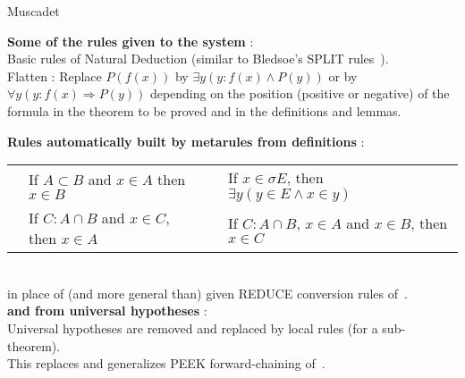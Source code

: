 
\calculusAcronym{\Muscadet}




\maketitle

\begin{entry}{Muscadet}  

\begin{calculus}

\textbf {Some of the rules given to the system} :\\
\hspace*{0.1cm} 
Basic rules of Natural Deduction (similar to Bledsoe's SPLIT rules~).\\
\hspace*{0.1cm} 
Flatten : Replace $P(f(x))$ by $\exists y(y:f(x) \land P(y))$ or by $\forall y (y:f(x) \Rightarrow P(y))$ depending on the position (positive or negative)
of the formula in the theorem to be proved and in the definitions and lemmas.

\textbf {Rules automatically built by metarules from  definitions} :\\
\begin{tabular}{llll}
\hspace{0.1cm} 
& If $A \subset B$ and $x \in A$ then $x \in B$  & \hspace{0.2cm} &
If $x \in \sigma E$, then $\exists y (y \in E \land x \in y)$\\
& If $C:A \cap B$ and $x \in C$, then $x \in A$  &                &
If $C : A \cap B$, $x \in A$ and $x \in B$, then $x \in C$ \\
\end{tabular}\\
\hspace*{0.15cm} in place of (and more general than) given 
REDUCE conversion rules of~. \\
\textbf {and from universal hypotheses} :\\
\hspace*{0.1cm}Universal hypotheses are removed and replaced by local rules (for a sub-theorem).\\ 
\hspace*{0.1cm}This replaces and generalizes PEEK forward-chaining of~. 
\end{calculus}


\end{entry}
